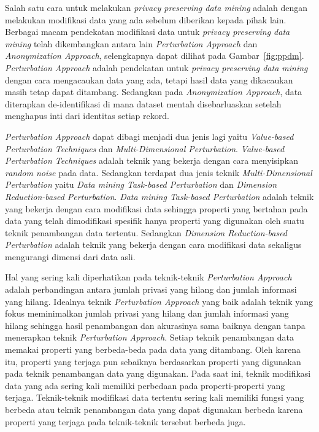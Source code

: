 \documentclass[a4paper,twoside]{article}
\begin{document}
\begin{enumerate}
		Salah satu cara untuk melakukan \textit{privacy preserving data mining} adalah dengan melakukan modifikasi data yang ada sebelum diberikan kepada pihak lain. Berbagai macam pendekatan modifikasi data untuk \textit{privacy preserving data mining} telah dikembangkan antara lain \textit{Perturbation Approach} dan \textit{Anonymization Approach}, selengkapnya dapat dilihat pada Gambar~\ref{fig:ppdm}. \textit{Perturbation Approach} adalah pendekatan untuk \textit{privacy preserving data mining} dengan cara mengacaukan data yang ada, tetapi hasil data yang dikacaukan masih tetap dapat ditambang. Sedangkan pada \textit{Anonymization Approach}, data diterapkan de-identifikasi di mana dataset mentah disebarluaskan setelah menghapus inti dari identitas setiap rekord.
		
		\textit{Perturbation Approach} dapat dibagi menjadi dua jenis lagi yaitu \textit{Value-based Perturbation Techniques} dan \textit{Multi-Dimensional Perturbation}. \textit{Value-based Perturbation Techniques} adalah teknik yang bekerja dengan cara menyisipkan \textit{random noise} pada data. Sedangkan terdapat dua jenis teknik \textit{Multi-Dimensional Perturbation} yaitu \textit{Data mining Task-based Perturbation} dan \textit{Dimension Reduction-based Perturbation}. \textit{Data mining Task-based Perturbation} adalah teknik yang bekerja dengan cara modifikasi data sehingga properti yang bertahan pada data yang telah dimodifikasi spesifik hanya properti yang digunakan oleh suatu teknik penambangan data tertentu. Sedangkan \textit{Dimension Reduction-based Perturbation} adalah teknik yang bekerja dengan cara modifikasi data sekaligus mengurangi dimensi dari data asli.
		
		Hal yang sering kali diperhatikan pada teknik-teknik \textit{Perturbation Approach} adalah perbandingan antara jumlah privasi yang hilang dan jumlah informasi yang hilang. Idealnya teknik \textit{Perturbation Approach} yang baik adalah teknik yang fokus meminimalkan jumlah privasi yang hilang dan jumlah informasi yang hilang sehingga hasil penambangan dan akurasinya sama baiknya dengan tanpa menerapkan teknik \textit{Perturbation Approach}. Setiap teknik penambangan data memakai properti yang berbeda-beda pada data yang ditambang. Oleh karena itu, properti yang terjaga pun sebaiknya berdasarkan properti yang digunakan pada teknik penambangan data yang digunakan. Pada saat ini, teknik modifikasi data yang ada sering kali memiliki perbedaan pada properti-properti yang terjaga. Teknik-teknik modifikasi data tertentu sering kali memiliki fungsi yang berbeda atau teknik penambangan data yang dapat digunakan berbeda karena properti yang terjaga pada teknik-teknik tersebut berbeda juga.


\end{enumerate}
\end{document}
